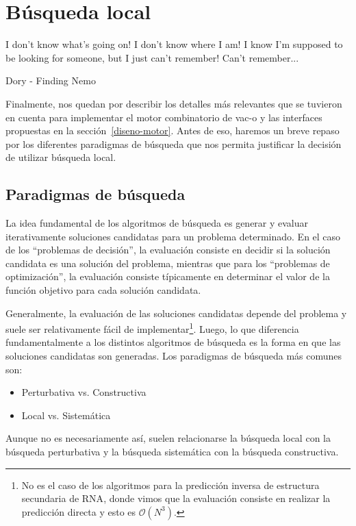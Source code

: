\chapter{B\'usqueda local}
\label{busqueda}
\epigraph{I don't know what's going on! I don't know where I am! I know I'm
supposed to be looking for someone, but I just can't remember! Can't
remember...}%
{Dory - Finding Nemo}

Finalmente, nos quedan por describir los detalles m\'as relevantes que se
tuvieron en cuenta para implementar el motor combinatorio de \ac{vac-o} y las
interfaces propuestas en la secci\'on~\ref{diseno-motor}. Antes de eso, haremos
un breve repaso por los diferentes paradigmas de b\'usqueda que nos permita
justificar la decisi\'on de utilizar b\'usqueda local.

\section{Paradigmas de b\'usqueda}

La idea fundamental de los algoritmos de b\'usqueda es generar y evaluar
iterativamente soluciones candidatas para un problema determinado. En el caso de
los ``problemas de decisi\'on'', la evaluaci\'on consiste en decidir si la
soluci\'on candidata es una soluci\'on del problema, mientras que para los
``problemas de optimizaci\'on'', la evaluaci\'on consiste t\'ipicamente en
determinar el valor de la funci\'on objetivo para cada soluci\'on candidata.

Generalmente, la evaluaci\'on de las soluciones candidatas depende del problema
y suele ser relativamente f\'acil de implementar\footnote{No es el caso de los
algoritmos para la predicci\'on inversa de estructura secundaria de \ac{RNA},
donde vimos que la evaluaci\'on consiste en realizar la predicci\'on directa y
esto es $\mathcal{O}(N^{3})$.}. Luego, lo que diferencia fundamentalmente a los
distintos algoritmos de b\'usqueda es la forma en que las soluciones candidatas
son generadas. Los paradigmas de b\'usqueda m\'as comunes son:
\begin{itemize}
 \item Perturbativa vs. Constructiva
 \item Local vs. Sistem\'atica
\end{itemize}

Aunque no es necesariamente as\'i, suelen relacionarse la b\'usqueda local con
la b\'usqueda perturbativa y la b\'usqueda sistem\'atica con la b\'usqueda
constructiva.

